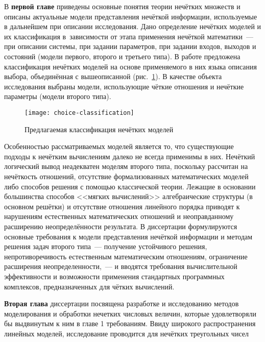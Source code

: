 В \textbf{первой главе} приведены основные понятия теории нечётких множеств и описаны актуальные модели представления нечёткой информации, используемые в дальнейшем при описании исследования. Дано определение нечётких моделей и их классификация в~зависимости от этапа применения нечёткой математики~--- при описании системы, при задании параметров, при задании входов, выходов и состояний (модели первого, второго и третьего типа). В работе предложена классификация нечётких моделей на основе применяемого в них языка описания выбора, объединённая с вышеописанной (рис.~\ref{fig:choice-classification}). В качестве объекта исследования выбраны модели, использующие чёткие отношения и нечёткие параметры (модели второго типа).
\begin{figure}[h] 
  \center
  \texttt{[image: choice-classification]}
  \caption{Предлагаемая классификация нечётких моделей} 
  \label{fig:choice-classification}
\end{figure}

Особенностью рассматриваемых моделей является то, что существующие подходы к нечётким вычислениям далеко не всегда применимы в них. Нечёткий логический вывод неадекватен моделям второго типа, поскольку рассчитан на нечёткость отношений, отсутствие формализованных математических моделей либо способов решения с помощью классической теории. Лежащие в основании большинства способов <<мягких вычислений>> алгебраические структуры (в основном решётки) и отсутствие отношения линейного порядка приводят к нарушениям естественных математических отношений и неоправданному расширению неопределённости результата. В диссертации формулируются основные требования к модели представления нечёткой информации и методам решения задач второго типа~--- получение устойчивого решения, непротиворечивость естественным математическим отношениям, ограничение расширения неопределенности,~--- и вводятся требования вычислительной эффективности и возможности применения стандартных программных комплексов, предназначенных для чётких вычислений.

\textbf{Вторая глава} диссертации посвящена разработке и исследованию методов моделирования и обработки нечетких числовых величин, которые удовлетворяли бы выдвинутым к ним в главе 1 требованиям. Ввиду широкого распространения линейных моделей, исследование проводится для нечётких треугольных чисел

